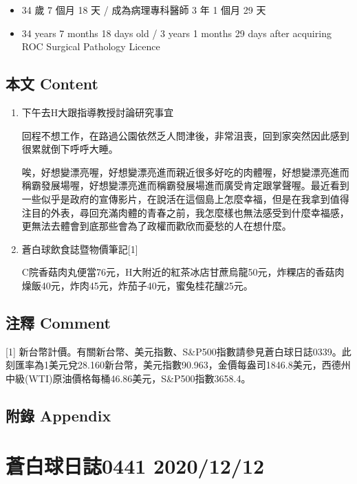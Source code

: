 \documentclass[a5paper, 11pt
]{book}
\providecommand{\tightlist}{%
  \setlength{\itemsep}{0pt}\setlength{\parskip}{0pt}}
\begin{document}
\begin{itemize}
\tightlist
\item
  34 歲 7 個月 18 天 / 成為病理專科醫師 3 年 1 個月 29 天
\item
  34 years 7 months 18 days old / 3 years 1 months 29 days after
  acquiring ROC Surgical Pathology Licence
\end{itemize}

\hypertarget{ux672cux6587-content-10}{%
\subsection{本文 Content}\label{ux672cux6587-content-10}}

\begin{enumerate}
\def\labelenumi{\arabic{enumi}.}
\item
  下午去H大跟指導教授討論研究事宜

  回程不想工作，在路過公園依然乏人問津後，非常沮喪，回到家突然因此感到很累就倒下呼呼大睡。

  唉，好想變漂亮喔，好想變漂亮進而親近很多好吃的肉體喔，好想變漂亮進而稱霸發展場喔，好想變漂亮進而稱霸發展場進而廣受肯定跟掌聲喔。最近看到一些似乎是政府的宣傳影片，在說活在這個島上怎麼幸福，但是在我拿到值得注目的外表，尋回充滿肉體的青春之前，我怎麼樣也無法感受到什麼幸福感，更無法去體會到底那些會為了政權而歡欣而憂愁的人在想什麼。
\item
  蒼白球飲食誌暨物價筆記{[}1{]}

  C院香菇肉丸便當76元，H大附近的紅茶冰店甘蔗烏龍50元，炸粿店的香菇肉燥飯40元，炸肉45元，炸茄子40元，蜜兔桂花釀25元。
\end{enumerate}

\hypertarget{ux6ce8ux91cb-comment-10}{%
\subsection{注釋 Comment}\label{ux6ce8ux91cb-comment-10}}

{[}1{]}
新台幣計價。有關新台幣、美元指數、S\&P500指數請參見蒼白球日誌0339。此刻匯率為1美元兌28.160新台幣，美元指數90.963，金價每盎司1846.8美元，西德州中級(WTI)原油價格每桶46.86美元，S\&P500指數3658.4。

\hypertarget{ux9644ux9304-appendix-10}{%
\subsection{附錄 Appendix}\label{ux9644ux9304-appendix-10}}

\hypertarget{ux84bcux767dux7403ux65e5ux8a8c0441-20201212}{%
\section{蒼白球日誌0441
2020/12/12}\label{ux84bcux767dux7403ux65e5ux8a8c0441-20201212}}
\end{document}
